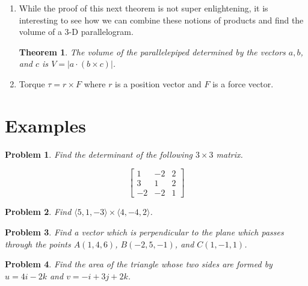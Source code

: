 \documentclass[11pt]{article}
\newtheorem{theorem}{Theorem}
\newtheorem{problem}{Problem}
\begin{document}
\begin{enumerate}
    \item While the proof of this next theorem is not super enlightening, it is interesting to see how we can combine these notions of products and find the volume of a 3-D parallelogram.

    \begin{theorem}
        The volume of the parallelepiped determined by the vectors $a,b$, and $c$ is $V=|a \cdot (b\times c)|$.
    \end{theorem}

    \item  Torque $\tau = r \times F$ where $r$ is a position vector and $F$ is a force vector.
\end{enumerate}



\section{Examples}


\begin{problem}
    Find the determinant of the following $3\times 3$ matrix.

    \begin{equation*}
        \begin{bmatrix}
            1&-2&2 \\
            3 &1&2 \\
            -2 & -2 &1 
        \end{bmatrix}
    \end{equation*}
\end{problem}

\vspace{3cm}


\begin{problem}
    Find $\langle 5,1,-3 \rangle \times \langle 4,-4,2 \rangle$.
\end{problem}

\vspace{6cm}
\begin{problem}
Find a vector which is perpendicular to the plane which passes through the points $A(1,4,6)$, $B(-2,5,-1)$, and $C(1,-1,1)$.
\end{problem}

\vspace{5cm}


\begin{problem}
    Find the area of the triangle whose two sides are formed by $u = 4i-2k$ and $v=-i+3j+2k$.
\end{problem}
\end{document}
